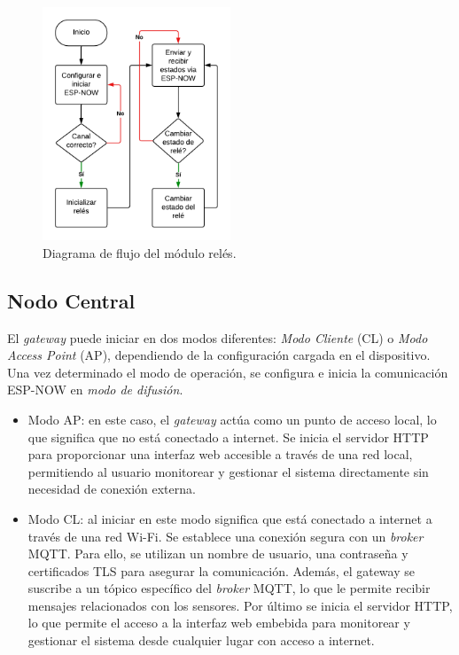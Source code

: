 \begin{figure}[H]
\centering 
\includegraphics[width=0.5\textwidth]{./Figures/flujo_rele.png}
\caption{Diagrama de flujo del módulo relés.}
\label{fig:flujoRele}
\end{figure}

\subsection{Nodo Central}

El \textit{gateway} puede iniciar en dos modos diferentes: \textit{Modo Cliente} (CL) o \textit{Modo Access Point} (AP), dependiendo de la configuración cargada en el dispositivo. Una vez determinado el modo de operación, se configura e inicia la comunicación ESP-NOW en \textit{modo de difusión}.

\begin{itemize}
	\item Modo AP: en este caso, el \textit{gateway} actúa como un punto de acceso local, lo que significa que no está conectado a internet. Se inicia el servidor HTTP para proporcionar una interfaz web accesible a través de una red local, permitiendo al usuario monitorear y gestionar el sistema directamente sin necesidad de conexión externa.
	\item Modo CL: al iniciar en este modo significa que está conectado a internet a través de una red Wi-Fi. Se establece una conexión segura con un \textit{broker} MQTT. Para ello, se utilizan un nombre de usuario, una contraseña y certificados TLS para asegurar la comunicación. Además, el gateway se suscribe a un tópico específico del \textit{broker} MQTT, lo que le permite recibir mensajes relacionados con los sensores. Por último se inicia el servidor HTTP, lo que permite el acceso a la interfaz web embebida para monitorear y gestionar el sistema desde cualquier lugar con acceso a internet.
\end{itemize}


